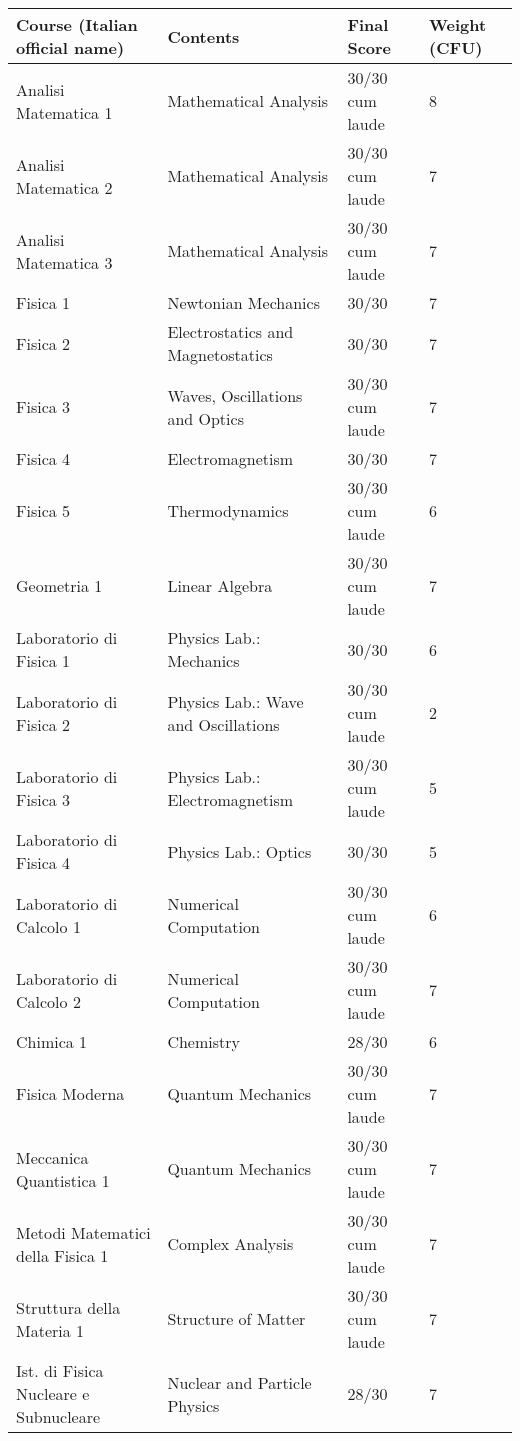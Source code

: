 \documentclass[a4paper,10pt,notitlepage]{paper}
\begin{document}
{\centering \footnotesize
\begin{tabular*}{\linewidth}{lll@{\hspace{0.7cm}}l@{\extracolsep{\fill}}}
\bf Course (Italian official name) & \bf Contents  & \bf Final Score &\bf Weight (CFU) \\
\hline \hline
Analisi Matematica 1  					&  Mathematical Analysis	& 30/30 cum laude &8\\	
Analisi Matematica 2  					&  Mathematical Analysis	&  30/30 cum laude &7\\	
Analisi Matematica 3  					&  Mathematical Analysis	& 30/30 cum laude &7\\	
Fisica 1  								&  Newtonian Mechanics& 30/30 &7\\	
Fisica 2  								&  Electrostatics and Magnetostatics &   30/30   &7\\
Fisica 3  								&  Waves, Oscillations and Optics&   30/30 cum laude &7\\		
Fisica 4  								&  Electromagnetism  & 30/30  &7\\	
Fisica 5  								&  Thermodynamics &    30/30 cum laude&6\\	
Geometria	 1							&  Linear Algebra &    30/30 cum laude &7\\		
Laboratorio di Fisica 1					&  Physics Lab.: Mechanics &  30/30 &6\\
Laboratorio di Fisica 2					&  Physics Lab.: Wave and Oscillations&  30/30   cum laude &2\\	
Laboratorio di Fisica 3					&  Physics Lab.: Electromagnetism&   30/30 cum laude  &5\\
Laboratorio di Fisica 4					&  Physics Lab.: Optics&   30/30 &5\\	
Laboratorio di Calcolo 1					&  Numerical Computation&    30/30  cum laude &6\\	
Laboratorio di Calcolo 2					&  Numerical Computation&     30/30 cum laude &7\\	
Chimica 1								&  Chemistry &     28/30 &6\\	
Fisica Moderna 						&  Quantum Mechanics&  30/30  cum laude &7\\	
Meccanica Quantistica 1					&  Quantum Mechanics&   30/30  cum laude &7\\
Metodi Matematici della Fisica 1			&  Complex Analysis &   30/30 cum laude &7\\
Struttura della Materia 1					&  Structure of Matter&  30/30 cum laude  &7\\
Ist. di Fisica Nucleare e Subnucleare			&  Nuclear and Particle Physics& 28/30 &7\\	

\end{tabular*}}
\end{document}
